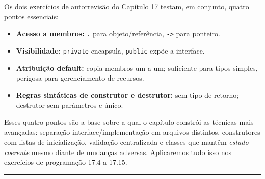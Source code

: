 \documentclass[11pt,a4paper]{article}
\begin{document}
Os dois exerc\'icios de autorrevisão do Cap\'itulo 17 testam, em conjunto, quatro pontos essenciais:

\begin{itemize}[leftmargin=*,itemsep=0pt]
  \item \textbf{Acesso a membros:} \texttt{.} para objeto/refer\^encia, \texttt{->} para ponteiro.
  \item \textbf{Visibilidade:} \texttt{private} encapsula, \texttt{public} exp\~oe a interface.
  \item \textbf{Atribui\c{c}\~ao default:} copia membros um a um; suficiente para tipos simples, perigosa para gerenciamento de recursos.
  \item \textbf{Regras sint\'aticas de construtor e destrutor:} sem tipo de retorno; destrutor sem par\^ametros e \'unico.
\end{itemize}

Esses quatro pontos s\~ao a base sobre a qual o cap\'itulo constr\'oi as t\'ecnicas mais avan\c{c}adas: separa\c{c}\~ao interface/implementa\c{c}\~ao em arquivos distintos, construtores com listas de inicializa\c{c}\~ao, valida\c{c}\~ao centralizada e classes que mant\^em \emph{estado coerente} mesmo diante de mudan\c{c}as adversas. Aplicaremos tudo isso nos exerc\'icios de programa\c{c}\~ao 17.4 a 17.15.

\vspace{1em}
\begin{center}\rule{0.5\textwidth}{0.4pt}\end{center}
\end{document}
